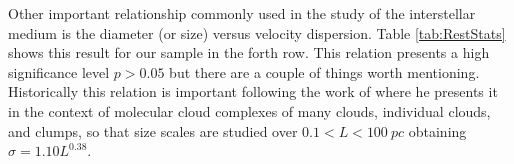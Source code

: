 






Other important relationship commonly used in the study of the interstellar medium is the diameter (or size) versus velocity dispersion.
Table \ref{tab:RestStats} shows this result for our sample in the forth row. 
This relation presents a high significance level \(p > \num{0.05}\) but there are a couple of things worth mentioning.
Historically this relation is important following the work of \citet{1981MNRAS.194..809L} where he presents it in the context of molecular cloud complexes of many clouds, individual clouds, and clumps, so that size scales are studied over \(\num{0.1} < L < \SI{100}{pc}\) obtaining \(\sigma = 1.10 L ^{0.38}\). 


